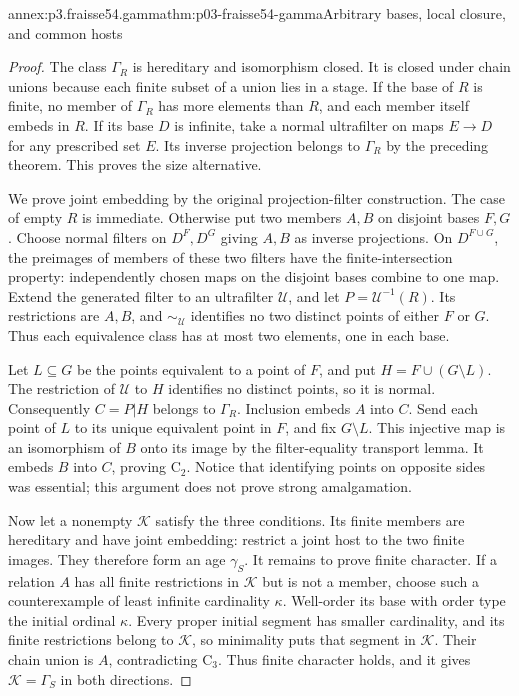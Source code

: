 \begin{annexitem}{annex:p3.fraisse54.gamma}{thm:p03-fraisse54-gamma}{Arbitrary bases, local closure, and common hosts}
\begin{proof}
The class \(\Gamma_R\) is hereditary and isomorphism closed. It is closed
under chain unions because each finite subset of a union lies in a stage.
If the base of \(R\) is finite, no member of \(\Gamma_R\) has more
elements than \(R\), and each member itself embeds in \(R\). If its
base \(D\) is infinite, take a normal ultrafilter on maps \(E\to D\)
for any prescribed set \(E\). Its inverse projection belongs to
\(\Gamma_R\) by the preceding theorem. This proves the size alternative.

We prove joint embedding by the original projection-filter construction.
The case of empty \(R\) is immediate. Otherwise put two members \(A,B\)
on disjoint bases \(F,G\). Choose normal filters on \(D^F,D^G\) giving
\(A,B\) as inverse projections. On \(D^{F\cup G}\), the preimages of
members of these two filters have the finite-intersection property:
independently chosen maps on the disjoint bases combine to one map. Extend
the generated filter to an ultrafilter \(\mathcal U\), and let
\(P=\mathcal U^{-1}(R)\). Its restrictions are \(A,B\), and
\(\sim_{\mathcal U}\) identifies no two distinct points of either
\(F\) or \(G\). Thus each equivalence class has at most two elements,
one in each base.

Let \(L\subseteq G\) be the points equivalent to a point of \(F\), and
put \(H=F\cup(G\setminus L)\). The restriction of \(\mathcal U\) to
\(H\) identifies no distinct points, so it is normal. Consequently
\(C=P|H\) belongs to \(\Gamma_R\). Inclusion embeds \(A\) into \(C\).
Send each point of \(L\) to its unique equivalent point in \(F\), and
fix \(G\setminus L\). This injective map is an isomorphism of \(B\)
onto its image by the filter-equality transport lemma. It embeds \(B\)
into \(C\), proving \(\mathrm C_2\). Notice that identifying points on
opposite sides was essential; this argument does not prove strong
amalgamation.

Now let a nonempty \(\mathcal K\) satisfy the three conditions.
Its finite members are hereditary and have joint embedding: restrict a
joint host to the two finite images. They therefore form an age
\(\gamma_S\). It remains to prove finite character. If a relation \(A\)
has all finite restrictions in \(\mathcal K\) but is not a member,
choose such a counterexample of least infinite cardinality \(\kappa\).
Well-order its base with order type the initial ordinal \(\kappa\).
Every proper initial segment has smaller cardinality, and its finite
restrictions belong to \(\mathcal K\), so minimality puts that segment
in \(\mathcal K\). Their chain union is \(A\), contradicting
\(\mathrm C_3\). Thus finite character holds, and it gives
\(\mathcal K=\Gamma_S\) in both directions.


\end{proof}
\end{annexitem}
